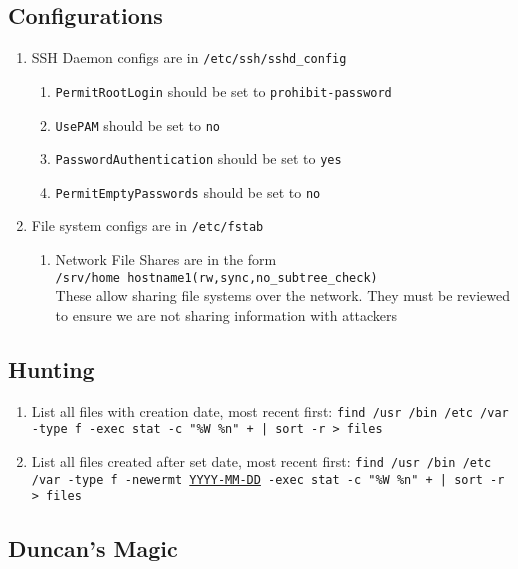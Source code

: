 \documentclass[12pt,letterpaper]{article}
\def\code#1{\textcolor{c2}{\texttt{#1}}}
\def\ul#1{\underline{#1}}
\begin{document}
\subsection{Configurations}

\begin{enumerate}
	\item SSH Daemon configs are in \code{/etc/ssh/sshd\_config}
		\begin{enumerate}
			\item \code{PermitRootLogin} should be set to \code{prohibit-password}
			\item \code{UsePAM} should be set to \code{no}
			\item \code{PasswordAuthentication} should be set to \code{yes}
			\item \code{PermitEmptyPasswords} should be set to \code{no}
		\end{enumerate}
	\item File system configs are in \code{/etc/fstab}
		\begin{enumerate}
			\item Network File Shares are in the form \\
				\code{/srv/home    hostname1(rw,sync,no\_subtree\_check)} \\
				These allow sharing file systems over the network.  They must be reviewed to ensure we are not sharing information with attackers
		\end{enumerate}
\end{enumerate}

\subsection{Hunting}

\begin{enumerate}
	\item List all files with creation date, most recent first: \code{find /usr /bin /etc /var -type f -exec stat -c "\%W \%n" {} + | sort -r > files}
	\item List all files created after set date, most recent first: \code{find /usr /bin /etc /var -type f -newermt \ul{YYYY-MM-DD} -exec stat -c "\%W \%n" {} + | sort -r > files}
\end{enumerate}

\subsection{Duncan's Magic}
\end{document}
